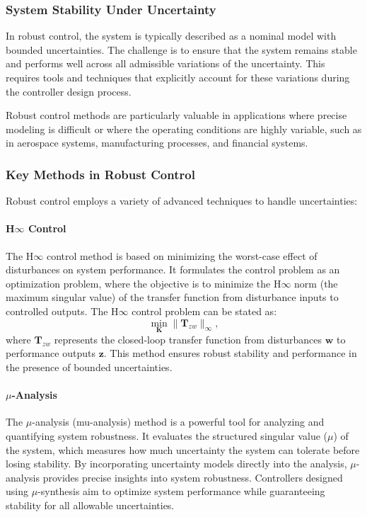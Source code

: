 \documentclass{IEEEojcsys}
\begin{document}
\subsubsection{System Stability Under Uncertainty}
In robust control, the system is typically described as a nominal model with bounded uncertainties. The challenge is to ensure that the system remains stable and performs well across all admissible variations of the uncertainty. This requires tools and techniques that explicitly account for these variations during the controller design process.

Robust control methods are particularly valuable in applications where precise modeling is difficult or where the operating conditions are highly variable, such as in aerospace systems, manufacturing processes, and financial systems.

\subsubsection{Key Methods in Robust Control}
Robust control employs a variety of advanced techniques to handle uncertainties:

\paragraph{H\ensuremath{\infty} Control}
The H\ensuremath{\infty} control method is based on minimizing the worst-case effect of disturbances on system performance. It formulates the control problem as an optimization problem, where the objective is to minimize the H\ensuremath{\infty} norm (the maximum singular value) of the transfer function from disturbance inputs to controlled outputs. The H\ensuremath{\infty} control problem can be stated as:
\[
\min_{\mathbf{K}} \|\mathbf{T}_{zw}\|_{\infty},
\]
where $\mathbf{T}_{zw}$ represents the closed-loop transfer function from disturbances $\mathbf{w}$ to performance outputs $\mathbf{z}$. This method ensures robust stability and performance in the presence of bounded uncertainties.

\paragraph{$\mu$-Analysis}
The $\mu$-analysis (mu-analysis) method is a powerful tool for analyzing and quantifying system robustness. It evaluates the structured singular value ($\mu$) of the system, which measures how much uncertainty the system can tolerate before losing stability. By incorporating uncertainty models directly into the analysis, $\mu$-analysis provides precise insights into system robustness. Controllers designed using $\mu$-synthesis aim to optimize system performance while guaranteeing stability for all allowable uncertainties.
\end{document}
